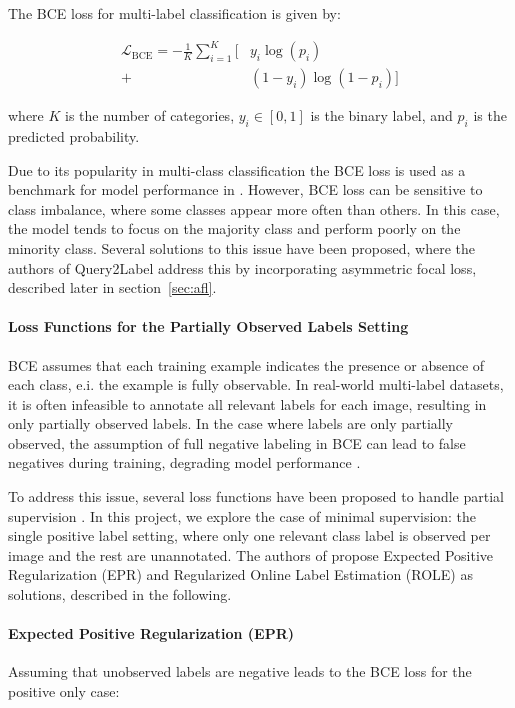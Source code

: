 \documentclass[lettersize,journal]{IEEEtran}
\begin{document}
The BCE loss for multi-label classification is given by:

\begin{equation}
\begin{aligned}
\mathcal{L}_{\text{BCE}} = -\frac{1}{K} \sum_{i=1}^{K} \bigl[ &y_i\log(p_i) \\
+ &(1-y_i)\log(1 - p_i) \bigr]
\end{aligned}
\end{equation}

\noindent where $K$ is the number of categories, $y_i\in[0,1]$ is the binary label, and $p_i$ is the predicted probability.

Due to its popularity in multi-class classification the BCE loss is used as a benchmark for model performance in \cite{mlsp}. However, BCE loss can be sensitive to class imbalance, where some classes appear more often than others. In this case, the model tends to focus on the majority class and perform poorly on the minority class. Several solutions to this issue have been proposed, where the authors of Query2Label address this by incorporating asymmetric focal loss, described later in section~\ref{sec:afl}. 


\paragraph{Loss Functions for the Partially Observed Labels Setting}
BCE assumes that each training example indicates the presence or absence of each class, e.i. the example is fully observable. In real-world multi-label datasets, it is often infeasible to annotate all relevant labels for each image, resulting in only partially observed labels. In the case where labels are only partially observed, the assumption of full negative labeling in BCE can lead to false negatives during training, degrading model performance \cite{mlsp}. 

To address this issue, several loss functions have been proposed to handle partial supervision \cite{mlsp}. In this project, we explore the case of minimal supervision: the single positive label setting, where only one relevant class label is observed per image and the rest are unannotated. The authors of \cite{mlsp} propose Expected Positive Regularization (EPR) and Regularized Online Label Estimation (ROLE) as solutions, described in the following.

\paragraph{Expected Positive Regularization (EPR)}
Assuming that unobserved labels are negative leads to the BCE loss for the positive only case:
\end{document}
